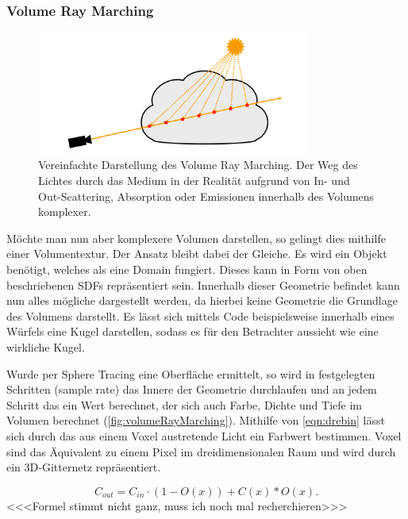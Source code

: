 



\subsubsection{Volume Ray Marching}

\begin{figure}[h]
	\centering
	\includegraphics[width=0.80\textwidth]{Grafiken/Basics/Volume/Volume_RayMarching.png}
	\begin{footnotesize}
		\caption{Vereinfachte Darstellung des Volume Ray Marching. Der Weg des Lichtes durch
			das Medium in der Realität aufgrund von In- und Out-Scattering, Absorption oder Emissionen innerhalb des
			Volumens komplexer.}
		\label{fig:volumeRayMarching}
	\end{footnotesize}
\end{figure}


Möchte man nun aber komplexere Volumen darstellen, so gelingt dies mithilfe einer Volumentextur. Der Ansatz bleibt dabei der Gleiche.
Es wird ein Objekt benötigt, welches als eine Domain fungiert. Dieses kann in Form von oben beschriebenen SDFs repräsentiert sein.
Innerhalb dieser Geometrie befindet kann nun alles mögliche dargestellt werden, da hierbei keine Geometrie die Grundlage des
Volumens darstellt. Es lässt sich mittels Code beispielsweise innerhalb eines Würfels eine Kugel darstellen,
sodass es für den Betrachter aussieht wie eine wirkliche Kugel.


Wurde per Sphere Tracing eine Oberfläche ermittelt, so wird in festgelegten Schritten (sample rate) das Innere der Geometrie durchlaufen und an jedem Schritt das
ein Wert berechnet, der sich auch Farbe, Dichte und Tiefe im Volumen berechnet (\autoref{fig:volumeRayMarching}).
Mithilfe von \autoref{eqn:drebin} \parencite{Drebin1988} lässt sich durch das aus einem Voxel austretende Licht ein Farbwert bestimmen. 
Voxel sind das Äquivalent zu einem Pixel im dreidimensionalen Raum und wird durch ein 3D-Gitternetz repräsentiert. 

\begin{equation}
	\label{eqn:drebin}
	C_{out} = C_{in} \cdot (1 - O(x)) + C(x) * O(x).
\end{equation}
<<<Formel stimmt nicht ganz, muss ich noch mal recherchieren>>>



